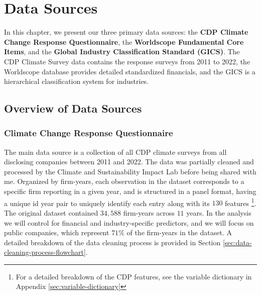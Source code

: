 \chapter{Data Sources}
\label{ch:data-sources}

\begin{keytakeaway}
  In this chapter, we present our three primary data sources: the \textbf{CDP Climate Change Response Questionnaire}, the \textbf{Worldscope Fundamental Core Items}, and the \textbf{Global Industry Classification Standard (GICS)}. The CDP Climate Survey data contains the response surveys from 2011 to 2022, the Worldscope database provides detailed standardized financials, and the GICS is a hierarchical classification system for industries.
\end{keytakeaway}




\section{Overview of Data Sources}

\subsection{Climate Change Response Questionnaire}
The main data source is a collection of all CDP climate surveys from all disclosing companies between 2011 and 2022. The data was partially cleaned and processed by the Climate and Sustainability Impact Lab \cite{HarvardD3Lab2024} before being shared with me. Organized by firm-years, each observation in the dataset corresponds to a specific firm reporting in a given year, and is structured in a panel format, having a unique id year pair to uniquely identify each entry along with its $130$ features \footnote{For a detailed breakdown of the CDP features, see the variable dictionary in Appendix \ref{sec:variable-dictionary}}. The original dataset contained $34,588$ firm-years across $11$ years. In the analysis we will control for financial and industry-specific predictors, and we will focus on public companies, which represent $71\%$ of the firm-years in the dataset. A detailed breakdown of the data cleaning process is provided in Section \ref{sec:data-cleaning-process-flowchart}.

